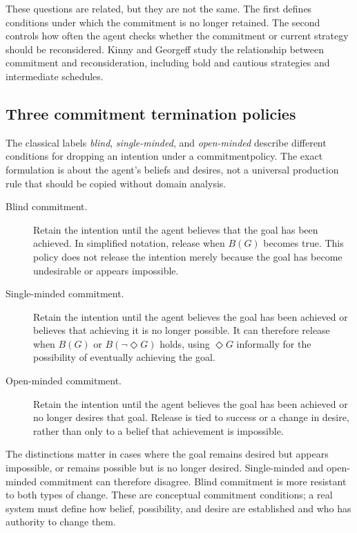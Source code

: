 These questions are related, but they are not the same. The first defines conditions under which the commitment is no longer retained. The second controls how often the agent checks whether the commitment or current strategy should be reconsidered. Kinny and Georgeff study the relationship between commitment and reconsideration, including bold and cautious strategies and intermediate schedules.\autocite{kinny1991commitment}

\subsection{Three commitment termination policies}

The classical labels \emph{blind}, \emph{single-minded}, and \emph{open-minded} describe different conditions for dropping an intention under a \gls{commitmentpolicy}. The exact formulation is about the agent's beliefs and desires, not a universal production rule that should be copied without domain analysis.\autocite{rao1995bdi,kinny1991commitment}

\begin{description}
  \item[Blind commitment.] Retain the intention until the agent believes that the goal has been achieved. In simplified notation, release when \(B(G)\) becomes true. This policy does not release the intention merely because the goal has become undesirable or appears impossible.
  \item[Single-minded commitment.] Retain the intention until the agent believes the goal has been achieved or believes that achieving it is no longer possible. It can therefore release when \(B(G)\) or \(B(\neg\Diamond G)\) holds, using \(\Diamond G\) informally for the possibility of eventually achieving the goal.
  \item[Open-minded commitment.] Retain the intention until the agent believes the goal has been achieved or no longer desires that goal. Release is tied to success or a change in desire, rather than only to a belief that achievement is impossible.
\end{description}

The distinctions matter in cases where the goal remains desired but appears impossible, or remains possible but is no longer desired. Single-minded and open-minded commitment can therefore disagree. Blind commitment is more resistant to both types of change. These are conceptual commitment conditions; a real system must define how belief, possibility, and desire are established and who has authority to change them.


